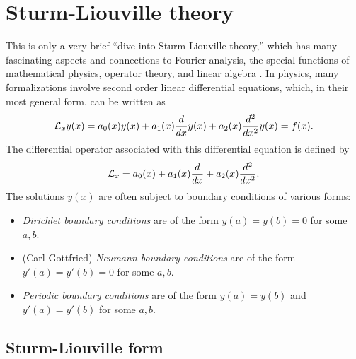 \chapter{Sturm-Liouville theory}
\label{2011-m-ch-sl}

This is only a very brief ``dive into Sturm-Liouville theory,''
which has many fascinating aspects and connections to Fourier analysis, the
special functions of mathematical physics, operator theory, and linear algebra
\cite{birkhoff-Rota-48,Al-Gwaiz,everitt-handbook-sl}.
In physics, many formalizations involve second order linear differential equations,
which, in their most general form, can be written as \cite{herman-sc}
\begin{equation}
{\cal L}_x y(x) =
a_0(x) y(x)  +
a_1(x) \frac{d}{dx}y(x)+
a_2(x) \frac{d^2}{dx^2}y(x) =
f(x).
\label{2011-m-ch-sl1}
\end{equation}
The differential operator associated with this differential equation is defined by
\begin{equation}
{\cal L}_x  = a_0(x)
+
a_1(x) \frac{d}{dx}+
a_2(x) \frac{d^2}{dx^2}.
\label{2011-m-ch-sl1do}
\end{equation}
The solutions $y(x)$ are often subject to boundary conditions of various forms:
\begin{itemize}
\item
{\em Dirichlet boundary conditions}
are of the form $y(a)=y(b)=0$ for some $a,b$.


\item
(Carl Gottfried) {\em  Neumann boundary conditions}
are of the form $y'(a)=y'(b)=0$ for some $a,b$.

\item
{\em Periodic boundary conditions}
are of the form $y(a)=y(b)$ and $y'(a)=y'(b)$ for some $a,b$.
\end{itemize}

\section{Sturm-Liouville form}

